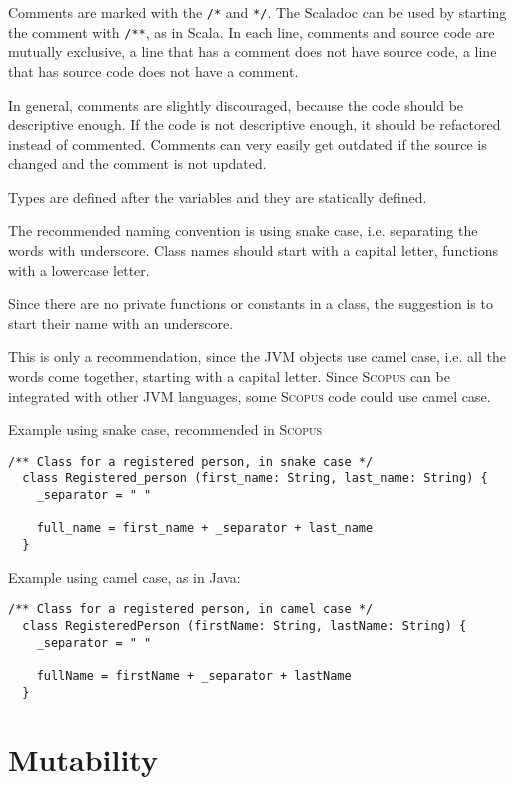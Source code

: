 \documentclass[12pt,a4paper]{book}
\newcommand{\srccode}[1]{\texttt{{#1}}}
\newcommand{\Scopus}{\textsc{Scopus}\xspace}
\begin{document}
    Comments are marked with the \srccode{/*} and  \srccode{*/}.
    The Scaladoc can be used by starting the comment with \srccode{/**}, as in Scala.
    In each line, comments and source code are mutually exclusive, a line that has a comment does not have source code, a line that has source code does not have a comment.

    In general, comments are slightly discouraged, because the code should be descriptive enough.
    If the code is not descriptive enough, it should be refactored instead of commented.
    Comments can very easily get outdated if the source is changed and the comment is not updated.

    Types are defined after the variables and they are statically defined.

    The recommended naming convention is using snake case, i.e. separating the words with underscore.
    Class names should start with a capital letter, functions with a lowercase letter.

    Since there are no private functions or constants in a class, the suggestion is to start their name with an underscore.

    This is only a recommendation, since the JVM objects use camel case, i.e. all the words come together, starting with a capital letter.
    Since \Scopus can be integrated with other JVM languages, some \Scopus code could use camel case.

    Example using snake case, recommended in \Scopus

    \begin{lstlisting}[label={lst:exampleExtendsSnakeCase}]
  /** Class for a registered person, in snake case */
  class Registered_person (first_name: String, last_name: String) {
    _separator = " "

    full_name = first_name + _separator + last_name
  }
    \end{lstlisting}

    Example using camel case, as in Java:
    \begin{lstlisting}[label={lst:exampleExtendsCamelCase}]
  /** Class for a registered person, in camel case */
  class RegisteredPerson (firstName: String, lastName: String) {
    _separator = " "

    fullName = firstName + _separator + lastName
  }
    \end{lstlisting}


    \section{Mutability}
\end{document}
